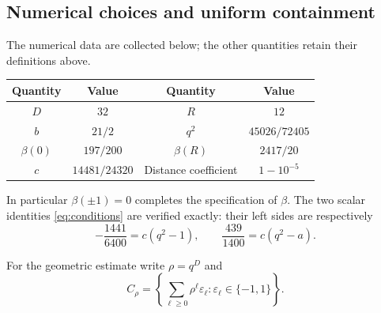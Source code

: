 \documentclass[11pt,letterpaper]{amsart}
\theoremstyle{definition}
\theoremstyle{remark}
\numberwithin{equation}{section}
\begin{document}
\subsection{Numerical choices and uniform containment}

The numerical data are collected below; the other
quantities retain their definitions above.
\begin{center}
\begin{tabular}{c@{\quad}c@{\qquad\qquad}c@{\quad}c}
\toprule
Quantity & Value & Quantity & Value\\ \midrule
\(D\) & \(32\) & \(R\) & \(12\)\\
\(b\) & \(21/2\) & \(q^2\) & \(45026/72405\)\\
\(\beta(0)\) & \(197/200\) & \(\beta(R)\) & \(2417/20\)\\
\(c\) & \(14481/24320\) & Distance coefficient & \(1-10^{-5}\)\\
\bottomrule
\end{tabular}
\end{center}
In particular \(\beta(\pm1)=0\) completes the specification of
\(\beta\). The two scalar identities \eqref{eq:conditions} are
verified exactly: their left sides are respectively
\[
                 -\frac{1441}{6400}=c(q^2-1),\qquad
                   \frac{439}{1400}=c(q^2-a).
\]

For the geometric estimate write \(\rho=q^D\) and
\[
 C_\rho=\left\{\sum_{\ell\ge0}\rho^\ell\varepsilon_\ell:
                              \varepsilon_\ell\in\{-1,1\}\right\}.
\]
\end{document}
